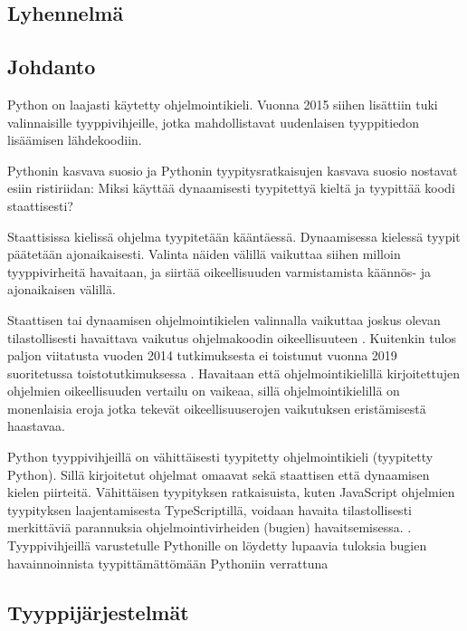\begin{otherlanguage}{finnish}
\chapter*{Lyhennelmä}

\section*{Johdanto}

Python on laajasti käytetty ohjelmointikieli. Vuonna 2015 siihen lisättiin tuki valinnaisille tyyppivihjeille, jotka mahdollistavat uudenlaisen tyyppitiedon lisäämisen lähdekoodiin.

Pythonin kasvava suosio ja Pythonin tyypitysratkaisujen kasvava suosio nostavat esiin ristiriidan: Miksi käyttää dynaamisesti tyypitettyä kieltä ja tyypittää koodi staattisesti?

Staattisissa kielissä ohjelma tyypitetään kääntäessä. Dynaamisessa kielessä tyypit päätetään ajonaikaisesti. Valinta näiden välillä vaikuttaa siihen milloin tyyppivirheitä havaitaan, ja siirtää oikeellisuuden varmistamista käännös- ja ajonaikaisen välillä.

Staattisen tai dynaamisen ohjelmointikielen valinnalla vaikuttaa joskus olevan tilastollisesti havaittava vaikutus ohjelmakoodin oikeellisuuteen \cite{nanz_comparative_2015, ray_codequality_2014}. Kuitenkin tulos paljon viitatusta vuoden 2014 tutkimuksesta \cite{ray_codequality_2014} ei toistunut vuonna 2019 suoritetussa toistotutkimuksessa \cite{codequality_reproudction_2019}. Havaitaan että ohjelmointikielillä kirjoitettujen ohjelmien oikeellisuuden vertailu on vaikeaa, sillä ohjelmointikielillä on monenlaisia eroja jotka tekevät oikeellisuuserojen vaikutuksen eristämisestä haastavaa.

Python tyyppivihjeillä on vähittäisesti tyypitetty ohjelmointikieli (tyypitetty Python). Sillä kirjoitetut ohjelmat omaavat sekä staattisen että dynaamisen kielen piirteitä. Vähittäisen tyypityksen ratkaisuista, kuten JavaScript ohjelmien tyypityksen laajentamisesta TypeScriptillä, voidaan havaita tilastollisesti merkittäviä parannuksia ohjelmointivirheiden (bugien) havaitsemisessa. \cite{gao_to_type_or_not_2017}. Tyyppivihjeillä varustetulle Pythonille on löydetty lupaavia tuloksia bugien havainnoinnista tyypittämättömään Pythoniin verrattuna \cite{khan_empirical_2022, rak-amnouykit_taleoftwo_2020}

\section*{Tyyppijärjestelmät}


\end{otherlanguage}
